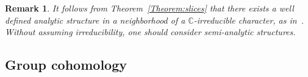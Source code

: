\documentclass[a4paper,11pt]{article}
\newtheorem{Definition}[Theorem]{Definition}
\newtheorem{Remark}[Theorem]{Remark}
\begin{document}
% 
%  

\begin{Remark}
 It follows from Theorem~\ref{Theorem:slices}
that there exists a well
defined analytic structure in a neighborhood of a $\mathbb C$-irreducible character, as 
in~\cite{JohnsonMillson}. Without assuming irreducibility,
one should consider semi-analytic structures.
 \end{Remark}






\subsection{Group cohomology}
\label{Section:cohomology}
\end{document}
